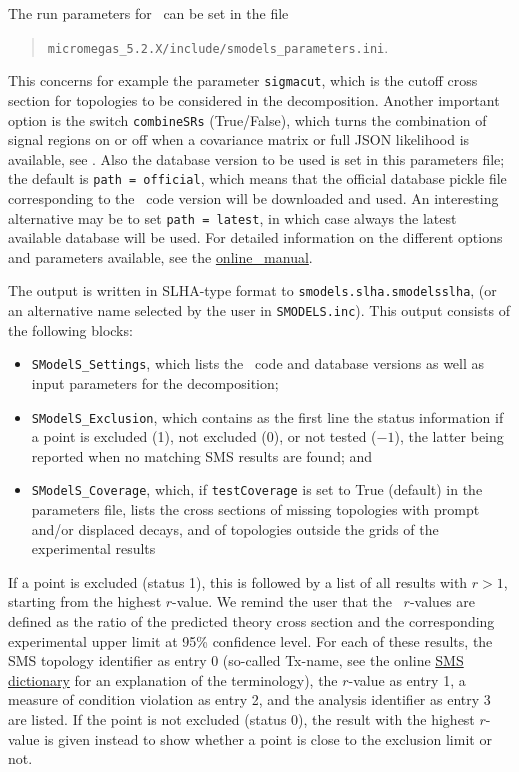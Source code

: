 \documentclass[12pt,a4paper]{article}
\begin{document}
The run parameters for \smodels\ can be set in the file
\begin{quote}
    \verb|micromegas_5.2.X/include/smodels_parameters.ini|.     %
 \end{quote}
This concerns for example the parameter \verb|sigmacut|, 
which  is the cutoff cross section for topologies to be considered in the decomposition. 
Another important option is the switch \verb|combineSRs| (True/False), which turns the combination of signal regions on or off when a covariance matrix or full JSON likelihood is available, see \cite{Ambrogi:2018ujg,Alguero:2020grj}.  
Also the database version to be used is set in this parameters file; the default is {\tt path = official}, which means that the official database pickle file corresponding to the \smodels\ code version will be downloaded and used. An interesting alternative may be to set {\tt path = latest}, in which case always the latest available database will be used. 
For detailed information on the different options and parameters available, see the 
\href{https://smodels.readthedocs.io/en/latest/RunningSModelS.html}{online \smodels\ manual}.

The output is written in SLHA-type format to {\tt smodels.slha.smodelsslha},
(or an alternative name selected by the user in \verb|SMODELS.inc|).
This output consists of the following blocks: 
\begin{itemize}
\item {\tt SModelS\_Settings}, which lists the \smodels\ code and database versions as well as input parameters for the decomposition; 
\item {\tt SModelS\_Exclusion}, which  
contains as the first line the status information if a point is excluded (1), not excluded (0), or not tested ($-1$), 
the latter being reported when no matching SMS results are found; and  
\item {\tt SModelS\_Coverage}, which,  if \verb|testCoverage| is set to True (default) in the parameters file, lists 
the cross sections of missing topologies with prompt and/or displaced decays, and of topologies outside the grids of the experimental results
\end{itemize}

If a point is excluded (status 1), this is followed by a list of all results with $r>1$, starting from the highest $r$-value.  
We remind the user that the \smodels\ $r$-values are defined as the ratio of the predicted theory cross section and the corresponding experimental  upper limit
at 95\% confidence level. 
For each of these results, the SMS topology identifier as entry 0 (so-called Tx-name, see %
the online \href{https://smodels.github.io/docs/SmsDictionary}{SMS dictionary} 
for an explanation of the terminology), 
the $r$-value as entry 1, a measure of condition violation as entry 2, and the analysis identifier as entry 3 are listed. 
If the point is not excluded (status 0), the result with the highest $r$-value is given instead to show whether a point is close to the exclusion limit or not. 
\end{document}
